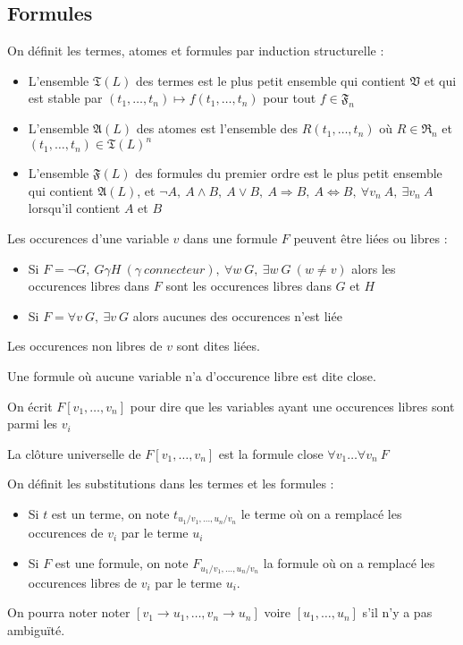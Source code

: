 \documentclass[a4paper]{article}
\begin{document}
\subsection{Formules}

\begin{definition}
  On définit les termes, atomes et formules par induction structurelle :
  \begin{itemize}
  \item L'ensemble $\mathfrak{T}(L)$ des termes est le plus petit ensemble qui contient $\mathfrak{V}$ et qui est stable par $(t_1,\dots,t_n) \mapsto f(t_1,\dots,t_n)$ pour tout $f \in \mathfrak{F}_n$
  \item L'ensemble $\mathfrak{A}(L)$ des atomes est l'ensemble des $R(t_1,\dots,t_n)$ où $R \in \mathfrak{R}_n$ et $(t_1,\dots,t_n) \in \mathfrak{T}(L)^n$
  \item L'ensemble $\mathfrak{F}(L)$ des formules du premier ordre est le plus petit ensemble qui contient $\mathfrak{A}(L)$, et $\neg A,\ A\wedge B,\ A\vee B,\ A\Rightarrow B,\ A\Leftrightarrow B,\ \forall v_n\ A,\ \exists v_n\ A$ lorsqu'il contient $A$ et $B$
  \end{itemize}
\end{definition}

\begin{definition}
  Les occurences d'une variable $v$ dans une formule $F$ peuvent être liées ou libres :
  \begin{itemize}
  \item Si $F = \neg G,\ G\gamma H\ (\gamma\ connecteur),\ \forall w\ G,\ \exists w\ G\ (w \neq v)$ alors les occurences libres dans $F$ sont les occurences libres dans $G$ et $H$
  \item Si $F = \forall v\ G,\ \exists v\ G$ alors aucunes des occurences n'est liée
  \end{itemize}

  Les occurences non libres de $v$ sont dites liées.

  Une formule où aucune variable n'a d'occurence libre est dite close.

  On écrit $F[v_1,\dots,v_n]$ pour dire que les variables ayant une occurences libres sont parmi les $v_i$

  La clôture universelle de $F[v_1,\dots,v_n]$ est la formule close $\forall v_1\dots\forall v_n\ F$
\end{definition}

\begin{definition}
  On définit les substitutions dans les termes et les formules :
  \begin{itemize}
  \item Si $t$ est un terme, on note $t_{u_1/v_1,\dots,u_n/v_n}$ le terme où on a remplacé les occurences de $v_i$ par le terme $u_i$
  \item Si $F$ est une formule, on note $F_{u_1/v_1,\dots,u_n/v_n}$ la formule où on a remplacé les occurences libres de $v_i$ par le terme $u_i$.
  \end{itemize}

  On pourra noter noter $[v_1\rightarrow u_1,\dots,v_n\rightarrow u_n]$ voire $[u_1,\dots,u_n]$ s'il n'y a pas ambiguïté.
\end{definition}
\end{document}
